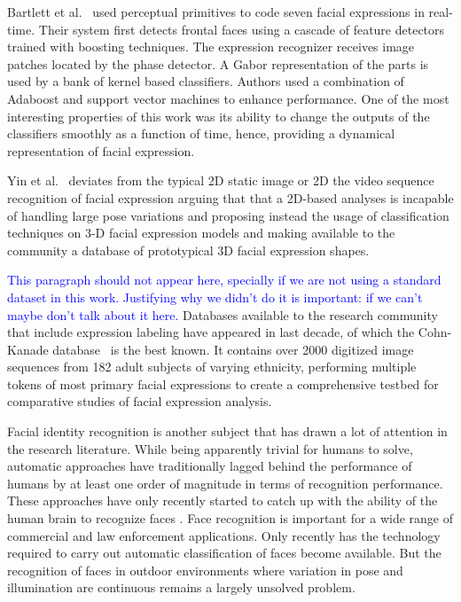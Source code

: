 \documentclass[]{article}
\begin{document}
Bartlett et al.~\cite{Bartlett4624313} used perceptual primitives to code seven facial expressions in real-time. Their system
first detects frontal faces using a cascade of feature detectors trained with boosting techniques. The expression
recognizer receives image patches located by the phase detector. A Gabor representation of the parts is used  by a bank
of kernel based classifiers. Authors used a combination of Adaboost and support vector machines to enhance performance.
One of the most interesting properties of this work was its ability to change the outputs of the classifiers smoothly
as a function of time, hence, providing a dynamical representation of facial expression.

Yin et al.~\cite{lijunyin} deviates from the typical 2D static image or 2D the video sequence recognition of
facial expression arguing that that a 2D-based analyses is incapable of handling large pose variations and proposing
instead the usage of classification techniques on 3-D facial expression models and making available to the community a
database of prototypical 3D facial expression shapes.

\textcolor{blue}{This paragraph should not appear here, specially if
  we are not using a standard dataset in this work. Justifying why we
  didn't do it is important: if we can't maybe don't talk about it here.}
Databases available to the research community that include expression
labeling have appeared in last decade, of which the Cohn-Kanade
database~\cite{Cohn840611} is the best known. It contains over 2000
digitized image sequences from  182 adult subjects of varying
ethnicity, performing multiple tokens of most primary facial
expressions to create a comprehensive testbed for
comparative studies of facial expression analysis.


Facial identity recognition is another subject that has drawn a lot of attention in the research literature. While being
apparently trivial for humans to solve, automatic approaches have traditionally lagged behind the performance of humans
by at least one order of magnitude in terms of recognition performance. These approaches have only recently started to
catch up with the ability of the human brain to recognize faces \cite{onintelligence, Rozado2012b}. Face recognition is
important  for a wide range of commercial and law enforcement applications. Only recently has the technology required to
carry out automatic classification of faces become available. But the recognition of faces in outdoor environments 
where variation in pose and illumination are continuous remains a largely unsolved problem.
\end{document}

